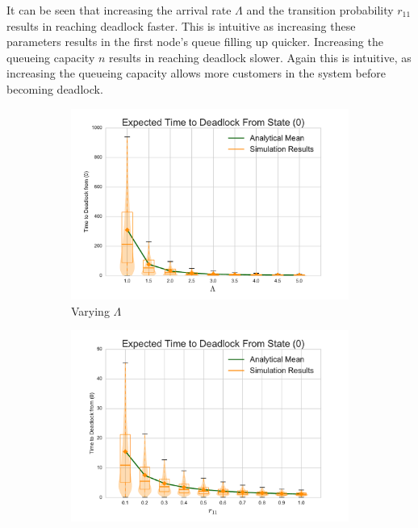\documentclass{article}
\begin{document}
It can be seen that increasing the arrival rate $\Lambda$ and the transition probability $r_{11}$ results in reaching deadlock faster.
This is intuitive as increasing these parameters results in the first node's queue filling up quicker.
Increasing the queueing capacity $n$ results in reaching deadlock slower.
Again this is intuitive, as increasing the queueing capacity allows more customers in the system before becoming deadlock.


\begin{figure}[!htbp]
\begin{subfigure}[b]{0.5\textwidth}
  \includegraphics[width=\textwidth]{images/varyL}
  \caption{Varying $\Lambda$}
  \label{fig:timestodeadlock_L}
\end{subfigure}
\begin{subfigure}[b]{0.5\textwidth}
  \includegraphics[width=\textwidth]{images/varyr11}

\end{subfigure}
\end{figure}
\end{document}

